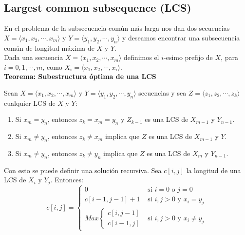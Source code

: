 \begin{multicols}{2}
\subsection{Largest common subsequence (LCS)}
En el problema de la subsecuencia com\'un m\'as larga nos dan dos secuencias $X=\langle x_1,x_2,\cdots,x_m\rangle$ y $Y=\langle y_1,y_2,\cdots,y_n\rangle$ y deseamos encontrar una subsecuencia com\'un de longitud m\'axima de $X$ y $Y$. \\

Dada una secuencia $X=\langle x_1,x_2,\cdots,x_m\rangle$ definimos el $i$-esimo prefijo de $X$, para $i=0,1,\cdots,m$, como $X_i=\langle x_1,x_2,\cdots,x_i\rangle$.\\

\textbf{Teorema: Subestructura \'optima de una LCS}

Sean $X=\langle x_1,x_2,\cdots,x_m\rangle$ y $Y=\langle y_1,y_2,\cdots,y_n\rangle$ secuencias y sea $Z=\langle z_1,z_2,\cdots,z_k\rangle$ cualquier LCS de $X$ y $Y$:
\begin{enumerate}
	\item Si $x_m = y_n$, entonces $z_k=x_m=y_n$ y $Z_{k-1}$ es una LCS de $X_{m-1}$ y $Y_{n-1}$.
	\item Si $x_m \neq y_n$, entonces $z_k\neq x_m$ implica que $Z$ es una LCS de $X_{m-1}$ y $Y$.
	\item Si $x_m \neq y_n$, entonces $z_k\neq y_n$ implica que $Z$ es una LCS de $X_m$ y $Y_{n-1}$.
\end{enumerate}
Con esto se puede definir una soluci\'on recursiva. Sea $c[i,j]$ la longitud de una LCS de $X_i$ y $Y_j$. Entonces:
\[
	c[i,j]=\left \{ \begin{array}{ll}
			0 & \mbox{si $i=0$ o $j=0$} \\
			c[i-1,j-1]+1 & \mbox{si $i,j>0$ y $x_i=y_j$} \\
	Max \left \{ \begin{array}{l} c[i,j-1] \\ c[i-1,j] \end{array} \right. & \mbox{si $i,j>0$ y $x_i\neq y_j$} \end{array} \right.
\]
\end{multicols}
\pagebreak